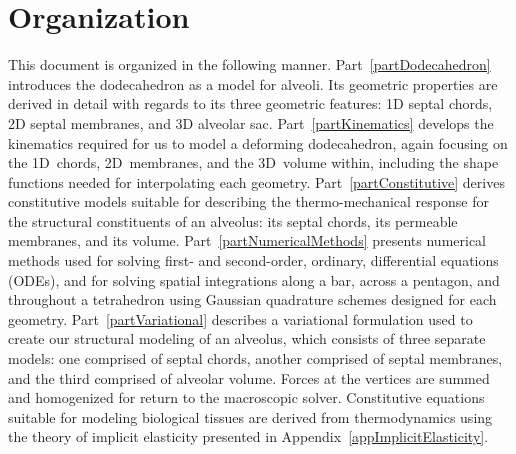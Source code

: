 \section{Organization}

This document is organized in the following manner.  Part~\ref{partDodecahedron} introduces the dodecahedron as a model for alveoli.  Its geometric properties are derived in detail with regards to its three geometric features: 1D septal chords, 2D septal membranes, and 3D alveolar sac.  Part~\ref{partKinematics} develops the kinematics required for us to model a deforming dodecahedron, again focusing on the 1D~chords, 2D~membranes, and the 3D~volume within, including the shape functions needed for interpolating each geometry.  Part~\ref{partConstitutive} derives constitutive models suitable for describing the thermo-mechanical response for the structural constituents of an alveolus: its septal chords, its permeable membranes, and its volume.  Part~\ref{partNumericalMethods} presents numerical methods used for solving first- and second-order, ordinary, differential equations (ODEs), and for solving spatial integrations along a bar, across a pentagon, and throughout a tetrahedron using Gaussian quadrature schemes designed for each geometry.  Part~\ref{partVariational} describes a variational formulation used to create our structural modeling of an alveolus, which consists of three separate models: one comprised of septal chords, another comprised of septal membranes, and the third comprised of alveolar volume.  Forces at the vertices are summed and homogenized for return to the macroscopic solver.  Constitutive equations suitable for modeling biological tissues are derived from thermo\-dynamics using the theory of implicit elasticity presented in Appendix~\ref{appImplicitElasticity}.
